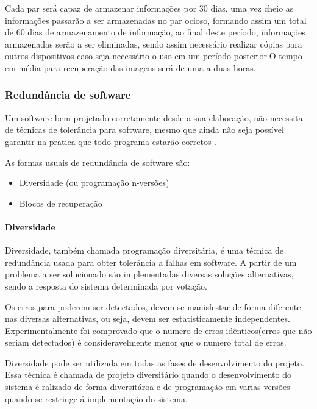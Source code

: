 Cada par será capaz de armazenar informações por 30 dias, uma vez cheio as informações passarão a ser armazenadas no par ocioso, formando assim um total de 60 dias de armazenamento de informação, ao final deste período, informações armazenadas serão a ser eliminadas, sendo assim necessário realizar cópias para outros dispositivos caso seja necessário o uso em um período posterior.O tempo em média para recuperação das imagens será de uma a duas horas.

\subsubsection{Redundância de software}

Um software bem projetado corretamente desde a sua elaboração, não necessita de técnicas de tolerância para software, mesmo que ainda não seja possível garantir na pratica que todo programa estarão corretos \cite{webertolerancia}.

As formas usuais de redundância de software são:

\begin{itemize}
	\item Diversidade (ou programação n-versões)
	\item Blocos de recuperação
\end{itemize}

\paragraph{Diversidade}

Diversidade, também chamada programação diversitária, é uma técnica de redundância usada para obter tolerância a falhas em software. A partir de um problema a ser solucionado são implementadas diversas soluções alternativas, sendo a resposta do sistema determinada por votação.

Os erros,para poderem ser detectados, devem se manisfestar de forma diferente nas diversas alternativas, ou seja, devem ser estatisticamente independentes. Experimentalmente foi comprovado que o numero de erros idênticos(erros que não seriam detectados) é consideravelmente menor que o numero total de erros.

Diversidade pode ser utilizada em todas as fases de desenvolvimento do projeto. Essa técnica é chamada de projeto diversitário quando o desenvolvimento do sistema é ralizado de forma diversitároa e de programação em varias versões quando se restringe á implementação do sistema.

